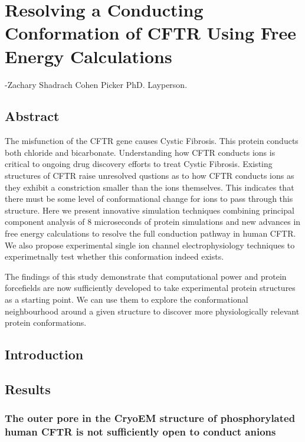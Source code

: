 \chapter{Resolving a Conducting Conformation of CFTR Using Free Energy Calculations}
\label{chap:opening}
 {-Zachary Shadrach Cohen Picker PhD. Layperson.}

\section*{\centering Abstract} 
The misfunction of the CFTR gene causes Cystic Fibrosis. This protein conducts both chloride and bicarbonate. Understanding how CFTR conducts ions is critical to ongoing drug discovery efforts to treat Cystic Fibrosis. Existing structures of CFTR raise unresolved qustions as to how CFTR conducts ions as they exhibit a constriction smaller than the ions themselves. This indicates that there must be some level of conformational change for ions to pass through this structure. Here we present innovative simulation techniques combining principal component analysis of 8 microseconds of protein simulations and new advances in free energy calculations to resolve the full conduction pathway in human CFTR. We also propose experimental single ion channel electrophysiology techniques to experimetnally test whether this conformation indeed exists.  

The findings of this study demonstrate that computational power and protein forcefields are now sufficiently developed to take experimental protein structures as a starting point. We can use them to explore the conformational neighbourhood around a given structure to discover more physiologically relevant protein conformations. 


\section{Introduction}

\section{Results}

\subsection{The outer pore in the CryoEM structure of phosphorylated human CFTR is not sufficiently open to conduct anions}

